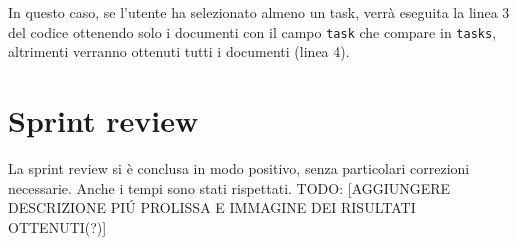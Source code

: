 \\\\

\noindent In questo caso, se l'utente ha selezionato almeno un task, verrà eseguita la linea 3 del codice ottenendo solo i documenti con il campo \texttt{task} che compare in \texttt{tasks}, altrimenti verranno ottenuti tutti i documenti (linea 4).

\section{Sprint review}
La sprint review si è conclusa in modo positivo, senza particolari correzioni necessarie.
Anche i tempi sono stati rispettati.
TODO: [AGGIUNGERE DESCRIZIONE PIÚ PROLISSA E IMMAGINE DEI RISULTATI OTTENUTI(?)]